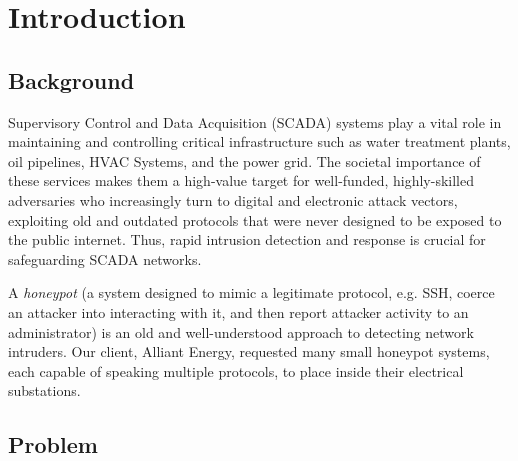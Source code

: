 \section*{\color{NavyBlue}Introduction}

\large

\subsection*{Background}

Supervisory Control and Data Acquisition (SCADA) systems play a vital role in
maintaining and controlling critical infrastructure such as
water treatment plants, oil pipelines, HVAC Systems, and the power grid.
The societal importance of these services makes them a high-value target
for well-funded, highly-skilled adversaries who increasingly turn to digital
and electronic attack vectors, exploiting old and outdated protocols that
were never designed to be exposed to the public internet.
Thus, rapid intrusion detection and response is crucial for safeguarding
SCADA networks.

A \textit{honeypot} (a system designed to mimic a legitimate protocol, e.g.
SSH, coerce an attacker into interacting with it, and then report attacker
activity  to an administrator) is an old and well-understood approach to
detecting network intruders. Our client, Alliant Energy, requested many
small honeypot systems, each capable of speaking multiple protocols, to place
inside their electrical substations.

\subsection*{Problem}

